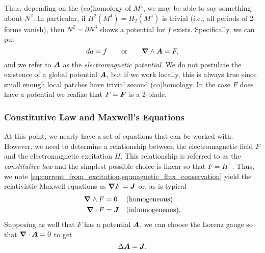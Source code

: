 \documentclass{article}
\begin{document}
Thus, depending on the (co)homology of $M^4$, we may be able to say something about $N^2$. In particular, if $H^2(M^4)=H_2(M^4)$ is trivial (i.e., all periods of 2-forms vanish), then $N^2=\partial N^3$ shows a potential for $f$ exists. Specifically, we can put
\begin{equation}
da = f \qquad \textrm{or} \qquad \boldsymbol{\nabla} \wedge \boldsymbol{A} = F,
\end{equation}
and we refer to $\boldsymbol{A}$ as the \emph{electromagnetic potential}. We do not postulate the existence of a global potential $\boldsymbol{A}$, but if we work locally, this is always true since small enough local patches have trivial second (co)homology. In the case $F$ does have a potential we realize that $F=\boldsymbol{F}$ is a 2-blade.

\subsubsection{Constitutive Law and Maxwell's Equations}

At this point, we nearly have a set of equations that can be worked with. However, we need to determine a relationship between the electromagnetic field $F$ and the electromagnetic excitation $H$. This relationship is referred to as the \emph{constitutive law} and the simplest possible choice is linear so that $F = H^\perp$. Thus, we note \cref{eq:current_from_excitation,eq:magnetic_flux_conservation} yield the relativistic Maxwell equations as $\boldsymbol{\nabla} F = \boldsymbol{J}$ or, as is typical
\begin{align}
	\boldsymbol{\nabla} \wedge F &= 0  &&\textrm{(homogeneous)}\\
	\boldsymbol{\nabla} \cdot F &= \boldsymbol{J} && \textrm{(inhomogeneous)}.
\end{align}
Supposing as well that $F$ has a potential $\boldsymbol{A}$, we can choose the Lorenz gauge so that $\boldsymbol{\nabla} \cdot \boldsymbol{A} = 0$ to get
\begin{equation}
\Delta \boldsymbol{A} = \boldsymbol{J}.
\end{equation}
\end{document}
